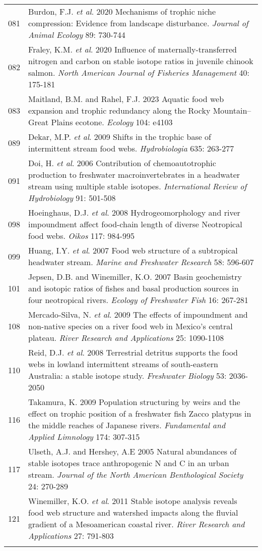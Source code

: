 \begin{longtable}{p{}p{}}
  081 & Burdon, F.J. \textit{et al}. 2020 Mechanisms of trophic niche compression: Evidence from landscape disturbance. \textit{Journal of Animal Ecology} 89: 730-744 \\ 
  082 & Fraley, K.M. \textit{et al}. 2020 Influence of maternally-transferred nitrogen and carbon on stable isotope ratios in juvenile chinook salmon. \textit{North American Journal of Fisheries Management} 40: 175-181 \\ 
  083 & Maitland, B.M. and Rahel, F.J. 2023 Aquatic food web expansion and trophic redundancy along the Rocky Mountain–Great Plains ecotone. \textit{Ecology} 104: e4103 \\ 
  089 & Dekar, M.P. \textit{et al}. 2009 Shifts in the trophic base of intermittent stream food webs. \textit{Hydrobiologia} 635: 263-277 \\ 
  091 & Doi, H. \textit{et al}. 2006 Contribution of chemoautotrophic production to freshwater macroinvertebrates in a headwater stream using multiple stable isotopes. \textit{International Review of Hydrobiology} 91: 501-508 \\ 
  098 & Hoeinghaus, D.J. \textit{et al}. 2008 Hydrogeomorphology and river impoundment affect food-chain length of diverse Neotropical food webs. \textit{Oikos} 117: 984-995 \\ 
  099 & Huang, I.Y. \textit{et al}. 2007 Food web structure of a subtropical headwater stream. \textit{Marine and Freshwater Research} 58: 596-607 \\ 
  101 & Jepsen, D.B. and Winemiller, K.O. 2007 Basin geochemistry and isotopic ratios of fishes and basal production sources in four neotropical rivers. \textit{Ecology of Freshwater Fish} 16: 267-281 \\ 
  108 & Mercado‐Silva, N. \textit{et al}. 2009 The effects of impoundment and non-native species on a river food web in Mexico's central plateau. \textit{River Research and Applications} 25: 1090-1108 \\ 
  110 & Reid, D.J. \textit{et al}. 2008 Terrestrial detritus supports the food webs in lowland intermittent streams of south-eastern Australia: a stable isotope study. \textit{Freshwater Biology} 53: 2036-2050 \\ 
  116 & Takamura, K. 2009 Population structuring by weirs and the effect on trophic position of a freshwater fish Zacco platypus in the middle reaches of Japanese rivers. \textit{Fundamental and Applied Limnology} 174: 307-315 \\ 
  117 & Ulseth, A.J. and Hershey, A.E 2005 Natural abundances of stable isotopes trace anthropogenic N and C in an urban stream. \textit{Journal of the North American Benthological Society} 24: 270-289 \\ 
  121 & Winemiller, K.O. \textit{et al}. 2011 Stable isotope analysis reveals food web structure and watershed impacts along the fluvial gradient of a Mesoamerican coastal river. \textit{River Research and Applications} 27: 791-803 \\ 
   \hline
\hline
\label{tab:meta-list}
\end{longtable}
\endgroup
